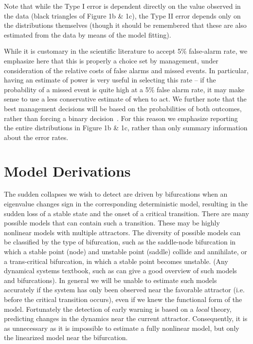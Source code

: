 \documentclass[authoryear, preprint,review,12pt]{elsarticle}
\begin{document}
Note that while the Type I error is dependent directly on the value observed in the data (black triangles of Figure 1b \& 1c),
the Type II error depends only on the distributions themselves (though it should be remembered that these are also estimated from the data by means of the model fitting).  

While it is customary in the scientific literature to accept 5\% false-alarm rate,
we emphasize here that this is properly a choice set by management,
under consideration of the relative costs of false alarms and missed events.
In particular, having an estimate of power is very useful in selecting this rate --
if the probability of a missed event is quite high at a 5\% false alarm rate,
it may make sense to use a less conservative estimate of when to act.
We further note that the best management decisions will be based on the probabilities of both outcomes,
rather than forcing a binary decision~\citep{Brozovic2011}.
For this reason we emphasize reporting the entire distributions in Figure 1b \& 1c, rather than only summary information about the error rates.  



\section{Model Derivations}\label{modelderivations}



The sudden collapses we wish to detect are driven by bifurcations when an eigenvalue changes sign in the corresponding deterministic model,
resulting in the sudden loss of a stable state and the onset of a critical transition.
There are many possible models that can contain such a transition.
These may be highly nonlinear models with multiple attractors.
The diversity of possible models can be classified by the type of bifurcation,
such as the saddle-node bifurcation in which a stable point (node) and unstable point (saddle) collide and annihilate,
or a trans-critical bifurcation, in which a stable point becomes unstable.  
(Any dynamical systems textbook, such as \citep{Guckenheimer1983} can give a good overview of such models and bifurcations). 
In general we will be unable to estimate such models accurately if the system has only been observed near the favorable attractor (i.e. before the critical transition occurs),
even if we knew the functional form of the model.  Fortunately the detection of early warning is based on a \emph{local} theory, predicting changes in the dynamics near the current attractor.
Consequently, it is as unnecessary as it is impossible to estimate a fully nonlinear model, but only the linearized model near the bifurcation.
\end{document}
